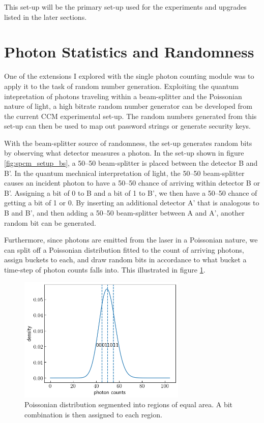 \documentclass[letterpaper, 11 pt]{article}
\begin{document}
This set-up will be the primary set-up used for the experiments and upgrades
listed in the later sections. 


\section{Photon Statistics and Randomness}

One of the extensions I explored with the single photon counting module was to
apply it to the task of random number generation. Exploiting the quantum
intepretation of photons traveling within a beam-splitter and the Poissonian
nature of light, a high bitrate random number generator can be developed from
the current CCM experimental set-up. The random numbers generated from this
set-up can then be used to map out password strings or generate security keys.

With the beam-splitter source of randomness, the set-up generates random bits by
observing what detector measures a photon. In the set-up shown in figure
\ref{fig:spcm_setup_bs}, a 50--50 beam-splitter is placed between the detector B
and B'. In the quantum mechnical interpretation of light, the 50--50
beam-splitter causes an incident photon to have a 50--50 chance of arriving
within detector B or B'. Assigning a bit of 0 to B and a bit of 1 to B', we then
have a 50--50 chance of getting a bit of 1 or 0. By inserting an additional
detector A' that is analogous to B and B', and then adding a 50--50
beam-splitter between A and A', another random bit can be generated. 

Furthermore, since photons are emitted from the laser in a Poissonian nature, we
can split off a Poissonian distribution fitted to the count of arriving photons,
assign buckets to each, and draw random bits in accordance to what bucket a
time-step of photon counts falls into. This illustrated in figure
\ref{fig:poisson}.
\begin{figure}[H]
    \centering
    \includegraphics[width = 8cm]{poisson_cut.png}
    \caption{Poissonian distribution segmented into regions of equal area. A bit combination is then assigned to each region.}
    \label{fig:poisson}
\end{figure}
\end{document}
